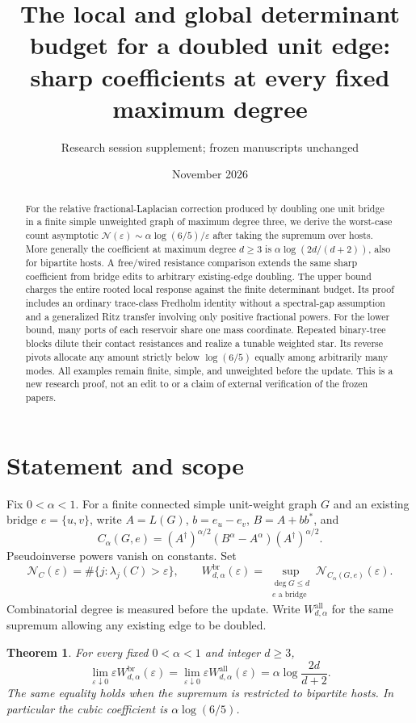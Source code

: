 \documentclass[11pt]{article}
\title{The local and global determinant budget for a doubled unit edge:\\
sharp coefficients at every fixed maximum degree}
\author{Research session supplement; frozen manuscripts unchanged}
\date{November 2026}
\newtheorem{theorem}{Theorem}[section]
\newcommand{\N}{\mathcal N}
\begin{document}
\maketitle
\begin{abstract}
For the relative fractional-Laplacian correction produced by doubling
one unit bridge in a finite simple unweighted graph of maximum degree
three, we derive the worst-case count asymptotic
$\N(\varepsilon)\sim\alpha\log(6/5)/\varepsilon$ after taking the
supremum over hosts. More generally the coefficient at maximum degree
$d\ge3$ is $\alpha\log(2d/(d+2))$, also for bipartite hosts.
A free/wired resistance comparison extends the same sharp coefficient
from bridge edits to arbitrary existing-edge doubling.
The upper bound charges the entire rooted local
response against the finite determinant budget. Its proof includes an
ordinary trace-class Fredholm identity without a spectral-gap assumption
and a generalized Ritz transfer involving only positive fractional
powers. For the lower bound, many ports of each reservoir share one
mass coordinate. Repeated binary-tree blocks dilute their contact
resistances and realize a tunable weighted star. Its reverse pivots
allocate any amount strictly below $\log(6/5)$ equally among arbitrarily
many modes. All examples remain finite, simple, and unweighted before the
update. This is a new research proof,
not an edit to or a claim of external verification of the frozen papers.
\end{abstract}

\section{Statement and scope}
Fix $0<\alpha<1$. For a finite connected simple unit-weight graph $G$
and an existing bridge $e=\{u,v\}$, write $A=L(G)$, $b=e_u-e_v$,
$B=A+bb^*$, and
\[
 C_\alpha(G,e)=(A^\dagger)^{\alpha/2}(B^\alpha-A^\alpha)
                                      (A^\dagger)^{\alpha/2}.
\]
Pseudoinverse powers vanish on constants. Set
\[
 \N_C(\varepsilon)=\#\{j:\lambda_j(C)>\varepsilon\},\qquad
 W^{\mathrm{br}}_{d,\alpha}(\varepsilon)
   =\sup_{\substack{\deg G\le d\\e\text{ a bridge}}}
                                    \N_{C_\alpha(G,e)}(\varepsilon).
\]
Combinatorial degree is measured before the update.
Write $W^{\mathrm{all}}_{d,\alpha}$ for the same supremum allowing
any existing edge to be doubled.

\begin{theorem}\label{thm:sharp}
For every fixed $0<\alpha<1$ and integer $d\ge3$,
\[
 \lim_{\varepsilon\downarrow0}\varepsilon
               W^{\mathrm{br}}_{d,\alpha}(\varepsilon)
 =\lim_{\varepsilon\downarrow0}\varepsilon
               W^{\mathrm{all}}_{d,\alpha}(\varepsilon)
 =\alpha\log\frac{2d}{d+2}.
\]
The same equality holds when the supremum is restricted to bipartite
hosts. In particular the cubic coefficient is $\alpha\log(6/5)$.
\end{theorem}
\end{document}

